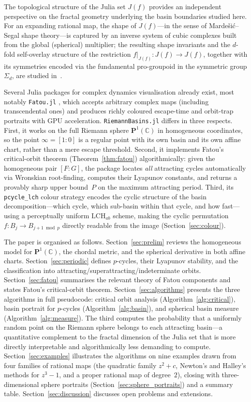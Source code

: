 \documentclass[12pt]{article}
\theoremstyle{definition}
\newcommand{\C}{\mathbb{C}}
\newcommand{\Pone}{\mathbf{P}^1(\C)}
\newcommand{\Jf}{J(f)}
\newcommand{\hpair}{[F:G]}
\begin{document}
The topological structure of the Julia set $\Jf$ provides an independent
perspective on the fractal geometry underlying the basin boundaries studied
here.  For an expanding rational map, the shape of $\Jf$---in the sense of
Marde\v{s}i\'c--Segal shape theory---is captured by an inverse system of
cubic complexes built from the global (spherical) multiplier; the resulting
shape invariants and the $d$-fold self-overlay structure of the restriction
$f|_{\Jf}\colon\Jf\to\Jf$, together with its symmetries encoded via the
fundamental pro-groupoid in the symmetric group $\Sigma_d$, are studied
in~\cite{Extremiana2018Shape,Extremiana2018SelfOverlays}.

Several Julia packages for complex dynamics visualisation already exist,
most notably \texttt{Fatou.jl} \cite{FatouJl}, which accepts arbitrary
complex maps (including transcendental ones) and produces richly coloured
escape-time and orbit-trap portraits with GPU acceleration.
\texttt{RiemannBasins.jl} differs in three respects.
First, it works on the full Riemann sphere $\Pone$ in homogeneous
coordinates, so the point $\infty=[1:0]$ is a regular point with its own
basin and its own affine chart, rather than a mere escape threshold.
Second, it implements Fatou's critical-orbit theorem
(Theorem~\ref{thm:fatou}) algorithmically: given the homogeneous pair
$\hpair$, the package locates \emph{all} attracting cycles automatically
via Wronskian root-finding, computes their Lyapunov constants, and returns
a provably sharp upper bound~$P$ on the maximum attracting period.
Third, its \texttt{pcycle\_lch} colour strategy encodes the cyclic
structure of the basin decomposition---which cycle, which sub-basin within
that cycle, and how fast---using a perceptually uniform
$\mathrm{LCH}_{ab}$ scheme, making the cyclic permutation
$f\colon B_j\to B_{j+1\bmod p}$ directly readable from the image
(Section~\ref{sec:colour}).

The paper is organised as follows.
Section~\ref{sec:prelim} reviews the homogeneous model for $\Pone$, the
chordal metric, and the spherical derivative in both affine charts.
Section~\ref{sec:periodic} defines $p$-cycles, their Lyapunov stability, and
the classification into attracting/superattracting/indeterminate orbits.
Section~\ref{sec:fatou} summarises the relevant theory of Fatou components and
states Fatou's critical-orbit theorem.
Section~\ref{sec:algorithms} presents the three algorithms in full
pseudocode: critical orbit analysis (Algorithm~\ref{alg:critical}),
basin portrait for $p$-cycles (Algorithm~\ref{alg:basin}), and
spherical basin measure (Algorithm~\ref{alg:measure}).
The third computes the probability that a uniformly random point on the
Riemann sphere belongs to each attracting basin---a quantitative
complement to the fractal dimension of the Julia set that is more
directly interpretable and algorithmically less demanding to compute.
Section~\ref{sec:examples} illustrates the algorithms on nine examples
drawn from four families of rational maps (the quadratic family $z^2+c$,
Newton's and Halley's methods for $z^3-1$, and a proper rational map of
degree~$2$), closing with three-dimensional sphere portraits
(Section~\ref{sec:sphere_portraits}) and a summary table.
Section~\ref{sec:discussion} discusses open problems and extensions.
\end{document}
